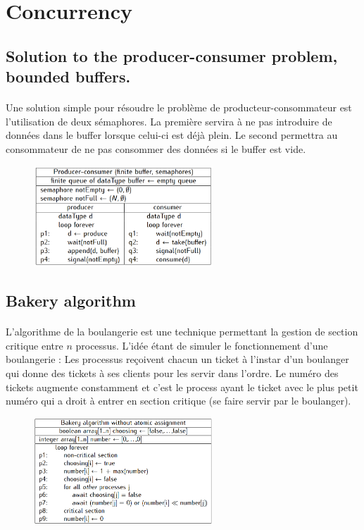 \section{Concurrency}
\subsection{Solution to the producer-consumer problem, bounded buffers.}
\paragraph{}
Une solution simple pour résoudre le problème de producteur-consommateur est l'utilisation de deux sémaphores.
La première servira à ne pas introduire de données dans le buffer lorsque celui-ci est déjà plein. Le second permettra au consommateur de ne pas consommer des données si le buffer est vide.
\begin{figure}[H]
	\centering
    \includegraphics[width=0.6\textwidth]{img_4_1__0}
\end{figure}



\subsection{Bakery algorithm}
\paragraph{}
L'algorithme de la boulangerie est une technique permettant la gestion de section critique entre $n$ processus. L'idée étant de simuler le fonctionnement d'une boulangerie : Les processus reçoivent chacun un ticket à l'instar d'un boulanger qui donne des tickets à ses clients pour les servir dans l'ordre. Le numéro des tickets augmente constamment et c'est le process ayant le ticket avec le plus petit numéro qui a droit à entrer en section critique (se faire servir par le boulanger).

\begin{figure}[H]
	\centering
    \includegraphics[width=0.6\textwidth]{img_4_2__0}
\end{figure}
